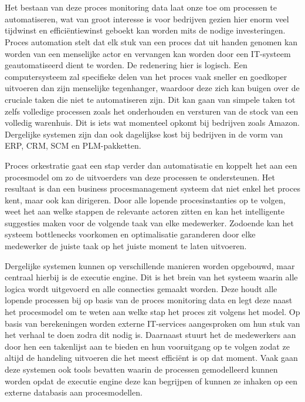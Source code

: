 \section{}%
\label{sec:proces orkestratie}
Het bestaan van deze proces monitoring data laat onze toe om processen te automatiseren, wat van groot interesse is voor bedrijven gezien hier enorm veel tijdwinst en efficiëntiewinst geboekt kan worden mits de nodige investeringen. Proces automation stelt dat elk stuk van een proces dat uit handen genomen kan worden van een menselijke actor en vervangen kan worden door een IT-systeem geautomatiseerd dient te worden. De redenering hier is logisch. Een computersysteem zal specifieke delen van het proces vaak sneller en goedkoper uitvoeren dan zijn menselijke tegenhanger, waardoor deze zich kan buigen over de cruciale taken die niet te automatiseren zijn. Dit kan gaan van simpele taken tot zelfs volledige processen zoals het onderhouden en versturen van de stock van een volledig warenhuis. Dit is iets wat momenteel opkomt bij bedrijven zoals Amazon.  Dergelijke systemen zijn dan ook dagelijkse kost bij bedrijven in de vorm van ERP, CRM, SCM en PLM-pakketten. \autocite[pp. 341-343]{Dumas2018}\newline

Proces orkestratie gaat een stap verder dan automatisatie en koppelt het aan een procesmodel om zo de uitvoerders van deze processen te ondersteunen. Het resultaat is dan een business procesmanagement systeem dat niet enkel het proces kent, maar ook kan dirigeren. Door alle lopende procesinstanties op te volgen, weet het aan welke stappen de relevante actoren zitten en kan het intelligente suggesties maken voor de volgende taak van elke medewerker. Zodoende kan het systeem bottlenecks voorkomen en optimalisatie garanderen door elke medewerker de juiste taak op het juiste moment te laten uitvoeren. \newline

Dergelijke systemen kunnen op verschillende manieren worden opgebouwd, maar centraal hierbij is de executie engine. Dit is het brein van het systeem waarin alle logica wordt uitgevoerd en alle connecties gemaakt worden. Deze houdt alle lopende processen bij op basis van de proces monitoring data en legt deze naast het procesmodel om te weten aan welke stap het proces zit volgens het model. Op basis van berekeningen worden externe IT-services aangesproken om hun stuk van het verhaal te doen zodra dit nodig is. Daarnaast stuurt het de medewerkers aan door hen een takenlijst aan te bieden en hun vooruitgang op te volgen zodat ze altijd de handeling uitvoeren die het meest efficiënt is op dat moment. Vaak gaan deze systemen ook tools bevatten waarin de processen gemodelleerd kunnen worden opdat de executie engine deze kan begrijpen of kunnen ze inhaken op een externe databasis aan procesmodellen. \autocite[pp. 344-351]{Dumas2018} \newline

